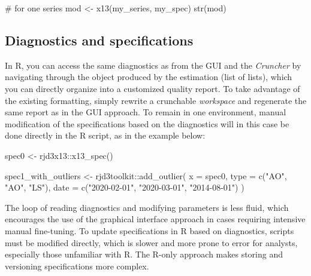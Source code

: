 \documentclass[
  letterpaper,
  DIV=11,
  numbers=noendperiod]{scrreprt}
\newenvironment{Shaded}{\begin{snugshade}}{\end{snugshade}}
\newcommand{\AttributeTok}[1]{\textcolor[rgb]{0.40,0.45,0.13}{#1}}
\newcommand{\CommentTok}[1]{\textcolor[rgb]{0.37,0.37,0.37}{#1}}
\newcommand{\FunctionTok}[1]{\textcolor[rgb]{0.28,0.35,0.67}{#1}}
\newcommand{\NormalTok}[1]{\textcolor[rgb]{0.00,0.23,0.31}{#1}}
\newcommand{\OtherTok}[1]{\textcolor[rgb]{0.00,0.23,0.31}{#1}}
\newcommand{\SpecialCharTok}[1]{\textcolor[rgb]{0.37,0.37,0.37}{#1}}
\newcommand{\StringTok}[1]{\textcolor[rgb]{0.13,0.47,0.30}{#1}}
\begin{document}
\begin{Shaded}
\begin{Highlighting}[]
\CommentTok{\# for one series }
\NormalTok{mod }\OtherTok{\textless{}{-}} \FunctionTok{x13}\NormalTok{(my\_series, my\_spec)}
\FunctionTok{str}\NormalTok{(mod)}
\end{Highlighting}
\end{Shaded}

\hypertarget{diagnostics-and-specifications}{%
\subsection*{Diagnostics and
specifications}\label{diagnostics-and-specifications}}

In R, you can access the same diagnostics as from the GUI and the
\emph{Cruncher} by navigating through the object produced by the
estimation (list of lists), which you can directly organize into a
customized quality report. To take advantage of the existing formatting,
simply rewrite a crunchable \emph{workspace} and regenerate the same
report as in the GUI approach. To remain in one environment, manual
modification of the specifications based on the diagnostics will in this
case be done directly in the R script, as in the example below:

\begin{Shaded}
\begin{Highlighting}[]
\NormalTok{spec0 }\OtherTok{\textless{}{-}}\NormalTok{ rjd3x13}\SpecialCharTok{::}\FunctionTok{x13\_spec}\NormalTok{()}

\NormalTok{spec1\_with\_outliers }\OtherTok{\textless{}{-}}\NormalTok{ rjd3toolkit}\SpecialCharTok{::}\FunctionTok{add\_outlier}\NormalTok{(}
    \AttributeTok{x =}\NormalTok{ spec0,}
    \AttributeTok{type =} \FunctionTok{c}\NormalTok{(}\StringTok{"AO"}\NormalTok{, }\StringTok{"AO"}\NormalTok{, }\StringTok{"LS"}\NormalTok{),}
    \AttributeTok{date =} \FunctionTok{c}\NormalTok{(}\StringTok{"2020{-}02{-}01"}\NormalTok{, }\StringTok{"2020{-}03{-}01"}\NormalTok{, }\StringTok{"2014{-}08{-}01"}\NormalTok{)}
\NormalTok{)}
\end{Highlighting}
\end{Shaded}

The loop of reading diagnostics and modifying parameters is less fluid,
which encourages the use of the graphical interface approach in cases
requiring intensive manual fine-tuning. To update specifications in R
based on diagnostics, scripts must be modified directly, which is slower
and more prone to error for analysts, especially those unfamiliar with
R. The R-only approach makes storing and versioning specifications more
complex.
\end{document}
